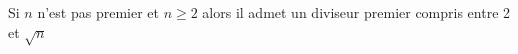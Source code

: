 
Si $n$ n'est pas premier et $n\geq 2$ alors il admet un diviseur premier compris entre 2 et $\sqrt{n}$

